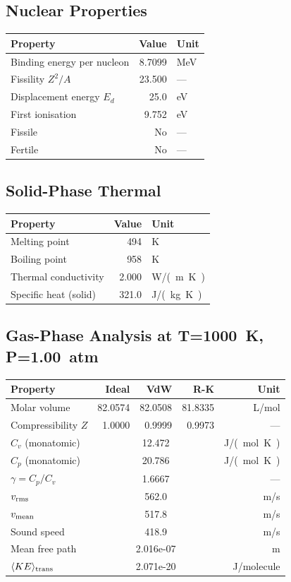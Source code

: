 \documentclass[11pt,a4paper]{article}
\begin{document}
\subsection{Nuclear Properties}
\begin{tabular}{lrl}
  \toprule
  Property & Value & Unit \\
  \midrule
  Binding energy per nucleon & 8.7099 & \si{MeV} \\
  Fissility $Z^2/A$ & 23.500 & --- \\
  Displacement energy $E_d$ & 25.0 & \si{eV} \\
  First ionisation & 9.752 & \si{eV} \\
  Fissile & No & --- \\
  Fertile & No & --- \\
  \bottomrule
\end{tabular}

\subsection{Solid-Phase Thermal}
\begin{tabular}{lrl}
  \toprule
  Property & Value & Unit \\
  \midrule
  Melting point & 494 & \si{K} \\
  Boiling point & 958 & \si{K} \\
  Thermal conductivity & 2.000 & \si{W/(m.K)} \\
  Specific heat (solid) & 321.0 & \si{J/(kg.K)} \\
  \bottomrule
\end{tabular}

\subsection{Gas-Phase Analysis at T=\SI{1000}{K}, P=\SI{1.00}{atm}}
\begin{tabular}{lrrrr}
  \toprule
  Property & Ideal & VdW & R-K & Unit \\
  \midrule
  Molar volume & 82.0574 & 82.0508 & 81.8335 & \si{L/mol} \\
  Compressibility $Z$ & 1.0000 & 0.9999 & 0.9973 & --- \\
  \midrule
  $C_v$ (monatomic) & \multicolumn{3}{c}{12.472} & \si{J/(mol.K)} \\
  $C_p$ (monatomic) & \multicolumn{3}{c}{20.786} & \si{J/(mol.K)} \\
  $\gamma = C_p/C_v$ & \multicolumn{3}{c}{1.6667} & --- \\
  $v_{\rm rms}$ & \multicolumn{3}{c}{562.0} & \si{m/s} \\
  $v_{\rm mean}$ & \multicolumn{3}{c}{517.8} & \si{m/s} \\
  Sound speed & \multicolumn{3}{c}{418.9} & \si{m/s} \\
  Mean free path & \multicolumn{3}{c}{2.016e-07} & \si{m} \\
  $\langle KE \rangle_{\rm trans}$ & \multicolumn{3}{c}{2.071e-20} & \si{J/molecule} \\
  \bottomrule
\end{tabular}
\end{document}
